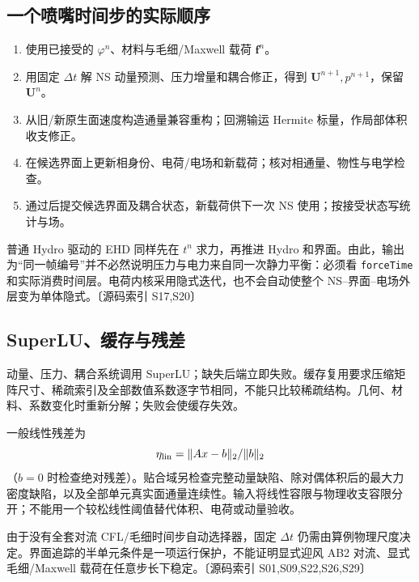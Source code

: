 \documentclass[UTF8,a4paper,11pt,fontset=fandol]{ctexart}
\newcommand{\code}[1]{\nolinkurl{#1}}
\newcommand{\src}[1]{\textcolor{ink}{\small〔源码索引 #1〕}}
\newcommand{\UU}{\bm{U}}
\newcommand{\dt}{\Delta t}
\begin{document}
\subsection{一个喷嘴时间步的实际顺序}
\begin{enumerate}
\item 使用已接受的 $\varphi^n$、材料与毛细/Maxwell 载荷 $\bm f^n$。
\item 用固定 $\dt$ 解 NS 动量预测、压力增量和耦合修正，得到 $\UU^{n+1},p^{n+1}$，保留 $\UU^n$。
\item 从旧/新原生面速度构造通量兼容重构；回溯输运 Hermite 标量，作局部体积收支修正。
\item 在候选界面上更新相身份、电荷/电场和新载荷；核对相通量、物性与电学检查。
\item 通过后提交候选界面及耦合状态，新载荷供下一次 NS 使用；按接受状态写统计与场。
\end{enumerate}
普通 Hydro 驱动的 EHD 同样先在 $t^n$ 求力，再推进 Hydro 和界面。由此，输出为“同一帧编号”并不必然说明压力与电力来自同一次静力平衡：必须看 \code{forceTime} 和实际消费时间层。电荷内核采用隐式迭代，也不会自动使整个 NS--界面--电场外层变为单体隐式。\src{S17,S20}

\subsection{SuperLU、缓存与残差}
动量、压力、耦合系统调用 SuperLU；缺失后端立即失败。缓存复用要求压缩矩阵尺寸、稀疏索引及全部数值系数逐字节相同，不能只比较稀疏结构。几何、材料、系数变化时重新分解；失败会使缓存失效。

一般线性残差为
\begin{equation}
 \eta_{\rm lin}=\|A x-b\|_2/\|b\|_2
\end{equation}
（$b=0$ 时检查绝对残差）。贴合域另检查完整动量缺陷、除对偶体积后的最大力密度缺陷，以及全部单元真实面通量连续性。输入将线性容限与物理收支容限分开；不能用一个较松线性阈值替代体积、电荷或动量验收。

由于没有全套对流 CFL/毛细时间步自动选择器，固定 $\dt$ 仍需由算例物理尺度决定。界面追踪的半单元条件是一项运行保护，不能证明显式迎风 AB2 对流、显式毛细/Maxwell 载荷在任意步长下稳定。\src{S01,S09,S22,S26,S29}

\end{document}
